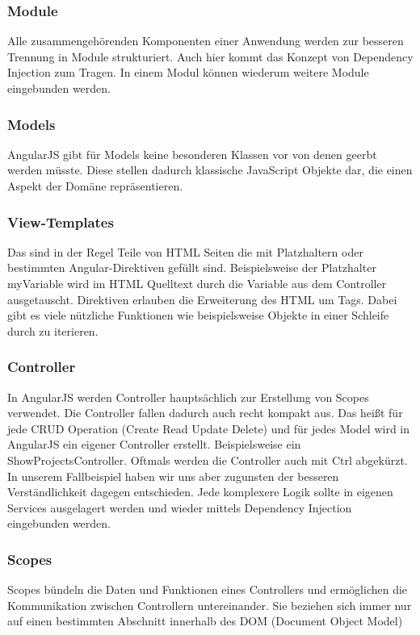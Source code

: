 \subsubsection{Module}
Alle zusammengehörenden Komponenten einer Anwendung werden zur besseren Trennung in Module strukturiert.
Auch hier kommt das Konzept von Dependency Injection zum Tragen.
In einem Modul können wiederum weitere Module eingebunden werden.

\subsubsection{Models}
AngularJS gibt für Models keine besonderen Klassen vor von denen geerbt werden müsste.
Diese stellen dadurch klassische JavaScript Objekte dar, die einen Aspekt der Domäne repräsentieren.

\subsubsection{View-Templates}
Das sind in der Regel Teile von HTML Seiten die mit Platzhaltern oder bestimmten Angular-Direktiven gefüllt sind.
Beispielsweise der Platzhalter {{myVariable}} wird im HTML Quelltext durch die Variable aus dem Controller ausgetauscht.
Direktiven erlauben die Erweiterung des HTML um Tags.
Dabei gibt es viele nützliche Funktionen wie beispielsweise Objekte in einer Schleife durch zu iterieren. 

\subsubsection{Controller}
In AngularJS werden Controller hauptsächlich zur Erstellung von Scopes verwendet.
Die Controller fallen dadurch auch recht kompakt aus.
Das heißt für jede CRUD Operation (Create Read Update Delete) und für jedes Model wird in AngularJS ein eigener Controller erstellt.
Beispielsweise ein ShowProjectsController.
Oftmals werden die Controller auch mit Ctrl abgekürzt.
In unserem Fallbeispiel haben wir uns aber zugunsten der besseren Verständlichkeit dagegen entschieden.
Jede komplexere Logik sollte in eigenen Services ausgelagert werden und wieder mittels Dependency Injection eingebunden werden. 

\subsubsection{Scopes}
Scopes bündeln die Daten und Funktionen eines Controllers und ermöglichen die Kommunikation zwischen Controllern untereinander.
Sie beziehen sich immer nur auf einen bestimmten Abschnitt innerhalb des DOM (Document Object Model)

